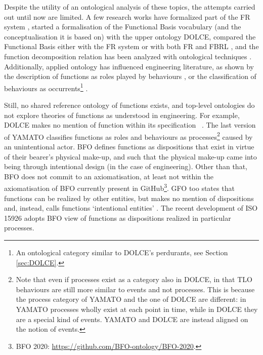 \documentclass[sw]{iosart2x}
\newcommand{\DOLCE}{\textsc{DOLCE}\xspace} %
\newcommand{\YAMATO}{\textsc{YAMATO}\xspace}
\newcommand{\BFO}{\textsc{BFO}\xspace}
\newcommand{\GFO}{\textsc{GFO}\xspace}
\newcommand{\TLO}{\textnormal{TLO}\xspace}
\newcommand{\quotes}[1]{`#1'}
\begin{document}
Despite the utility of an ontological analysis of these topics, the attempts carried out until now are limited. 
A few research works have formalized part of the FR system \cite{borgoFormalOntologicalPerspective2009}, started a formalisation of the Functional Basis vocabulary (and the conceptualisation it is based on) with the upper ontology \DOLCE \cite{borgoFormalizationFunctionsOperations2011}, compared the Functional Basis either with the FR system \cite{garbaczTwoOntologydrivenFormalisations2011} or with both FR and FBRL \cite{kitamuraDeepSemanticMapping2008}, and the function decomposition relation has been analyzed with ontological techniques \cite{vermaasFunctionalDecompositionMereology2009a,vermaasFormalImpossibilityAnalysing2013}. 
Additionally, applied ontology has influenced engineering literature, as shown by the description of functions as roles played by behaviours \cite{mizoguchiUnifyingDefinitionArtifact2016, kitamuraOntologicalModelDevice2006, chandrasekaranFunctionDeviceRepresentation2000}, or the classification of behaviours as occurrents\footnote{An ontological category similar to \DOLCE's perdurants, see Section \ref{sec:DOLCE}.}  \cite{kitamuraOntologicalModelDevice2006}.

Still, no shared reference ontology of functions exists, and top-level ontologies do not explore theories of functions as understood in engineering. 
For example, \DOLCE makes no mention of function within its specification  ~\cite{masoloWonderWebDeliverableD182003}. 
The last version of \YAMATO classifies functions as roles and behaviours as processes\footnote{Note that even if processes exist as a category also in \DOLCE, in that \TLO behaviours are still more similar to events and not processes. This is because the process category of \YAMATO and the one of \DOLCE are different: in \YAMATO processes wholly exist at each point in time, while in \DOLCE they are a special kind of events. \YAMATO  and \DOLCE are instead aligned on the notion of events. 
} 
caused by an unintentional actor. \BFO defines functions as dispositions that exist in virtue of their bearer's physical make-up, and such that the physical make-up came into being through intentional design (in the case of engineering). Other than that, \BFO does not commit to an axiomatisation, at least not within the axiomatisation of BFO currently present in GitHub\footnote{BFO 2020: \url{https://github.com/BFO-ontology/BFO-2020}.}.
\GFO too states that functions can be realized by other entities, but makes no mention of dispositions and, instead, calls functions \quotes{intentional entities} \cite{herreGeneralFormalOntology2006}.
The recent development of ISO 15926 \cite{kluwerISO159261420202020} adopts \BFO view of functions as dispositions realized in particular processes.
\end{document}
